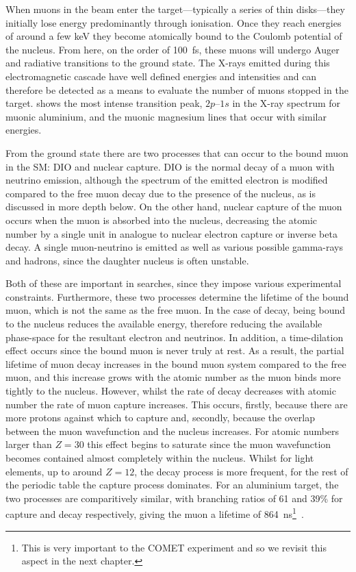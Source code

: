 When muons in the beam enter the target---typically a series of thin disks---they initially lose energy predominantly through ionisation.
Once they reach energies of around a few keV they become atomically bound to the Coulomb potential of the nucleus.
From here, on the order of 100~fs, these muons will undergo Auger and radiative transitions to the ground state.
The X-rays emitted during this electromagnetic cascade have well defined energies and intensities and can therefore be detected as a means to evaluate the number of muons stopped in the target.
 shows the most intense transition peak, $2p$--$1s$ in the X-ray spectrum for muonic aluminium, and the muonic magnesium lines that occur with similar energies.

\FigMuonicXrays
From the ground state there are two processes that can occur to the bound muon in the \ac{SM}:
\acf{DIO} and nuclear capture.
\ac{DIO} is the normal decay of a muon with neutrino emission, although the spectrum of the emitted electron is modified compared to the free muon decay due to the presence of the nucleus, as is discussed in more depth below.
On the other hand, nuclear capture of the muon occurs when the muon is absorbed into the nucleus, decreasing the atomic number by a single unit in analogue to nuclear electron capture or inverse beta decay.
A single muon-neutrino is emitted as well as various possible gamma-rays and hadrons, since the daughter nucleus is often unstable.

Both of these are important in \mueconv searches, since they impose various experimental constraints.
Furthermore, these two processes determine the lifetime of the bound muon, which is not the same as the free muon.
In the case of decay, being bound to the nucleus reduces the available energy, therefore reducing the available phase-space for the resultant electron and neutrinos. 
In addition, a time-dilation effect occurs since the bound muon is never truly at rest. 
As a result, the partial lifetime of muon decay increases in the bound muon system compared to the free muon, and this increase grows with the atomic number as the muon binds more tightly to the nucleus.
However, whilst the rate of decay decreases with atomic number the rate of muon capture increases.
This occurs, firstly, because there are more protons against which to capture and, secondly, because the overlap between the muon wavefunction and the nucleus increases.
For atomic numbers larger than $Z=30$ this effect begins to saturate since the muon wavefunction becomes contained almost completely within the nucleus.
Whilst for light elements, up to around $Z=12$, the decay process is more frequent, for the rest of the periodic table the capture process dominates.
For an aluminium target, the two processes are comparitively similar, with branching ratios of 61 and 39\% for capture and decay respectively, giving the muon a lifetime of 864~ns\footnote{
This is very important to the COMET experiment and so we revisit this aspect in the next chapter.%
}~\cite{Measday2007Comparison}.

